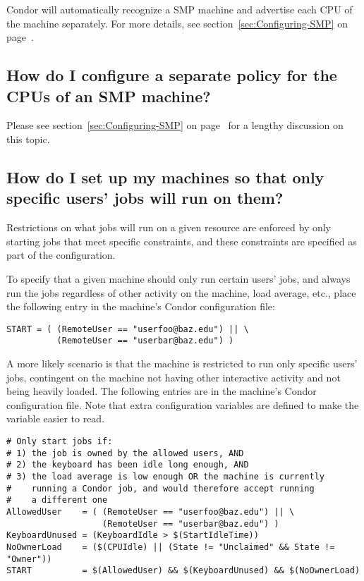 Condor will automatically recognize a SMP machine and advertise each
CPU of the machine separately.
For more details, see section~\ref{sec:Configuring-SMP} on
page~\pageref{sec:Configuring-SMP}.

\subsection*{How do I configure a separate policy for the CPUs of an SMP machine?}

Please see section~\ref{sec:Configuring-SMP} on
page~\pageref{sec:Configuring-SMP} for a lengthy discussion on
this topic.

\subsection*{How do I set up my machines so that only specific users' jobs will run on them?}

Restrictions on what jobs will run on a given resource are
enforced by only starting jobs that meet specific constraints,
and these constraints are specified as part of the configuration.

To specify that a given machine should only run certain users' jobs,
and always run the jobs regardless of other activity on the machine,
load average, etc.,
place the following entry in the
machine's Condor configuration file:

\footnotesize
\begin{verbatim}
START = ( (RemoteUser == "userfoo@baz.edu") || \
          (RemoteUser == "userbar@baz.edu") )
\end{verbatim}
\normalsize

A more likely scenario is that the machine is restricted to run
only specific users' jobs, contingent on the machine not having
other interactive activity and not being heavily loaded.
The following entries are in the machine's Condor configuration file. 
Note that extra configuration variables are defined to make 
the  variable easier to read.

\footnotesize
\begin{verbatim}
# Only start jobs if:
# 1) the job is owned by the allowed users, AND
# 2) the keyboard has been idle long enough, AND
# 3) the load average is low enough OR the machine is currently
#    running a Condor job, and would therefore accept running
#    a different one
AllowedUser    = ( (RemoteUser == "userfoo@baz.edu") || \
                   (RemoteUser == "userbar@baz.edu") )
KeyboardUnused = (KeyboardIdle > $(StartIdleTime))
NoOwnerLoad    = ($(CPUIdle) || (State != "Unclaimed" && State != "Owner"))
START          = $(AllowedUser) && $(KeyboardUnused) && $(NoOwnerLoad)
\end{verbatim}
\normalsize

